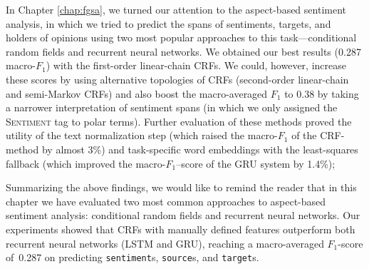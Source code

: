 \documentclass[11pt]{article}
\newcommand{\F}[0]{$F_1$}
\newcommand{\markable}[1]{\texttt{#1}}
\begin{document}
In Chapter \ref{chap:fgsa}, we turned our attention to the
aspect-based sentiment analysis, in which we tried to predict the
spans of sentiments, targets, and holders of opinions using two most
popular approaches to this task---conditional random fields and
recurrent neural networks.  We obtained our best results (0.287
macro-\F{}) with the first-order linear-chain CRFs.  We could,
however, increase these scores by using alternative topologies of CRFs
(second-order linear-chain and semi-Markov CRFs) and also boost the
macro-averaged \F{} to 0.38 by taking a narrower interpretation of
sentiment spans (in which we only assigned the \textsc{Sentiment} tag
to polar terms).  Further evaluation of these methods proved the
utility of the text normalization step (which raised the macro-\F{} of
the CRF-method by almost 3\%) and task-specific word embeddings with
the least-squares fallback (which improved the macro-\F{}--score of
the GRU system by 1.4\%);

Summarizing the above findings, we would like to remind the reader
that in this chapter we have evaluated two most common approaches to
aspect-based sentiment analysis: conditional random fields and
recurrent neural networks.  Our experiments showed that CRFs with
manually defined features outperform both recurrent neural networks
(LSTM and GRU), reaching a macro-averaged \F-score of~0.287 on
predicting \markable{sentiment}s, \markable{source}s, and
\markable{target}s.
\end{document}
